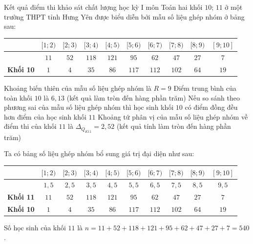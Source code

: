 \begin{ex}%
	Kết quả điểm thi khảo sát chất lượng học kỳ I môn Toán hai khối $10$; $11$ ở một trường THPT tỉnh Hưng Yên được biểu diễn bởi mẫu số liệu ghép nhóm ở bảng sau:
	\begin{center}
		{\setlength\extrarowheight{2pt}
			\begin{tabular}{|>{\centering\arraybackslash}m{2.5cm}|*{9}{c|}}
				\hline 
				{\bf Nhóm} & $[1;2)$ & $[2;3)$ & $[3;4)$ & $[4;5)$ & $[5;6)$ & $[6;7)$ & $[7;8)$ & $[8;9)$ & $[9;10]$\\
				\hline 
				{\bf Khối 11}& $11$ & $52$ & $118$ & $121$ & $95$ & $62$ & $47$ & $27$ & $7$\\
				\hline 
				{\bf Khối 10} & $1$ & $4$ & $35$ & $86$ & $117$ & $112$ & $102$ & $64$ & $19$\\
				\hline 
		\end{tabular}}
	\end{center}
	\choiceTF
	{\True Khoảng biến thiên của mẫu số liệu ghép nhóm là $R=9$}
	{Điểm trung bình của toàn khối $10$ là $6{,}13$ (kết quả làm tròn đến hàng phần trăm)}
	{\True Nếu so sánh theo phương sai của mẫu số liệu ghép nhóm thì học sinh khối $10$ có điểm đồng đều hơn điểm của học sinh khối $11$}
	{\True Khoảng tứ phân vị của mẫu số liệu ghép nhóm về điểm thi của khối $11$ là $\Delta_{Q_{K11}}=2{,}52$ (kết quả tính làm tròn đến hàng phần trăm)}
	\loigiai
	{Ta có bảng số liệu ghép nhóm bổ sung giá trị đại diện như sau:
		\begin{center}
			{\setlength\extrarowheight{2pt}
				\begin{tabular}{|>{\centering\arraybackslash}m{3cm}|*{9}{c|}}
					\hline 
					{\bf Nhóm} & $[1;2)$ & $[2;3)$ & $[3;4)$ & $[4;5)$ & $[5;6)$ & $[6;7)$ & $[7;8)$ & $[8;9)$ & $[9;10]$\\
					\hline 
					{\bf Giá trị đại diện} &$1{,}5$ & $2{,}5$ & $3{,}5$ & $4{,}5$ & $5{,}5$ & $6{,}5$ & $7{,}5$ & $8{,}5$ & $9{,}5$\\
					\hline
					{\bf Khối 11}& $11$ & $52$ & $118$ & $121$ & $95$ & $62$ & $47$ & $27$ & $7$\\
					\hline 
					{\bf Khối 10} & $1$ & $4$ & $35$ & $86$ & $117$ & $112$ & $102$ & $64$ & $19$\\
					\hline 
			\end{tabular}}	
		\end{center}
	\noindent
		Số học sinh của khối $11$ là $n=11+52+118+121+95+62+47+27+7=540$.\\
}
\end{ex}
